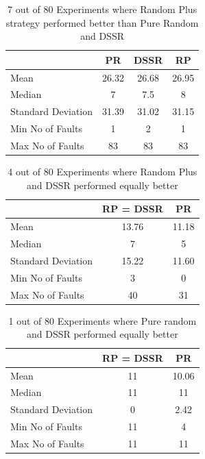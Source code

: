 \documentclass[conference]{IEEEtran}
\begin{document}

\begin{table}[H]
\caption{7 out of 80 Experiments where Random Plus strategy performed better than Pure Random and DSSR}
\centering
\begin{tabular}{|l|c|c|c|}
\hline\hline
 				& PR			&  DSSR 			& RP \\[1ex]
\hline
Mean  			&    26.32		&  26.68			&  26.95\\
Median 			&    7 		&  7.5 			&  8 \\
Standard Deviation 	&    31.39		&  31.02			&  31.15\\
Min No of Faults	&    1			&  2				&  1\\
Max No of Faults 	&    83		&  83				&  83\\
\hline
\end{tabular}
\label{table:result3}
\end{table}




\begin{table}[H]
\caption{4 out of 80 Experiments where Random Plus and DSSR performed equally better}
\centering
\begin{tabular}{|l|c|c|}
\hline\hline
 				& RP = DSSR			&  PR \\[1ex]
\hline
Mean  			&    13.76				&  11.18\\
Median 			&    7 				&  5\\
Standard Deviation 	&    15.22				&  11.60\\
Min No of Faults	&    3					&  0\\
Max No of Faults 	&    40				&  31\\
\hline
\end{tabular}
\label{table:result4}
\end{table}




\begin{table}[H]
\caption{1 out of 80 Experiments where Pure random and DSSR performed equally better}
\centering
\begin{tabular}{|l|c|c|}
\hline\hline
 				& RP = DSSR			&  PR \\[1ex]
\hline
Mean  			&    11				&  10.06\\
Median 			&    11 				&  11\\
Standard Deviation 	&    0					&  2.42\\
Min No of Faults	&    11				&  4\\
Max No of Faults 	&    11				&  11\\
\hline
\end{tabular}
\label{table:result5}
\end{table}
\end{document}
